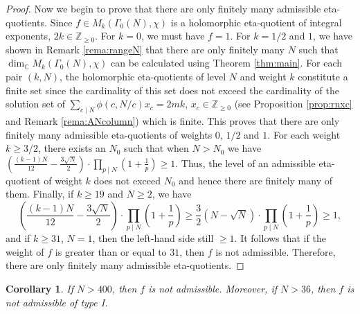 \documentclass[12pt]{amsart}
\numberwithin{equation}{section}
\theoremstyle{plain}
\newtheorem{coro}[thm]{Corollary}
\theoremstyle{definition}
\theoremstyle{remark}
\newcommand\numC{\mathbb{C}}
\newcommand\numgeq[2]{\mathbb{#1}_{\geq #2}}
\begin{document}
\begin{proof}
Now we begin to prove that there are only finitely many admissible eta-quotients. Since $f\in M_k(\Gamma_0(N), \chi)$ is a holomorphic eta-quotient of integral exponents, $2k\in\numgeq{Z}{0}$. For $k=0$, we must have $f=1$. For $k=1/2$ and $1$, we have shown in Remark \ref{rema:rangeN} that there are only finitely many $N$ such that $\dim_\numC M_k(\Gamma_0(N), \chi)$ can be calculated using Theorem \ref{thm:main}. For each pair $(k,N)$, the holomorphic eta-quotients of level $N$ and weight $k$ constitute a finite set since the cardinality of this set does not exceed the cardinality of the solution set of $\sum_{c\mid N}\phi(c,N/c)x_c=2mk$, $x_c\in\numgeq{Z}{0}$ (see Proposition \ref{prop:rnxc} and Remark \ref{rema:ANcolumn}) which is finite. This proves that there are only finitely many admissible eta-quotients of weights $0$, $1/2$ and $1$. For each weight $k\geq 3/2$, there exists an $N_0$ such that when $N>N_0$ we have $\left(\frac{(k-1)N}{12}-\frac{3\sqrt{N}}{2}\right)\cdot\prod_{p\mid N}\left(1+\frac{1}{p}\right)\geq1$. Thus, the level of an admissible eta-quotient of weight $k$ does not exceed $N_0$ and hence there are finitely many of them. Finally, if $k\geq19$ and $N\geq2$, we have
\begin{equation*}
\left(\frac{(k-1)N}{12}-\frac{3\sqrt{N}}{2}\right)\cdot\prod_{p\mid N}\left(1+\frac{1}{p}\right)\geq\frac{3}{2}(N-\sqrt{N})\cdot\prod_{p\mid N}\left(1+\frac{1}{p}\right)\geq1,
\end{equation*}
and if $k\geq31$, $N=1$, then the left-hand side still $\geq1$. It follows that if the weight of $f$ is greater than or equal to $31$, then $f$ is not admissible. Therefore, there are only finitely many admissible eta-quotients.
\end{proof}
\begin{coro}
\label{coro:admmissible}
If $N>400$, then $f$ is not admissible. Moreover, if $N>36$, then $f$ is not admissible of type I.
\end{coro}
\end{document}
